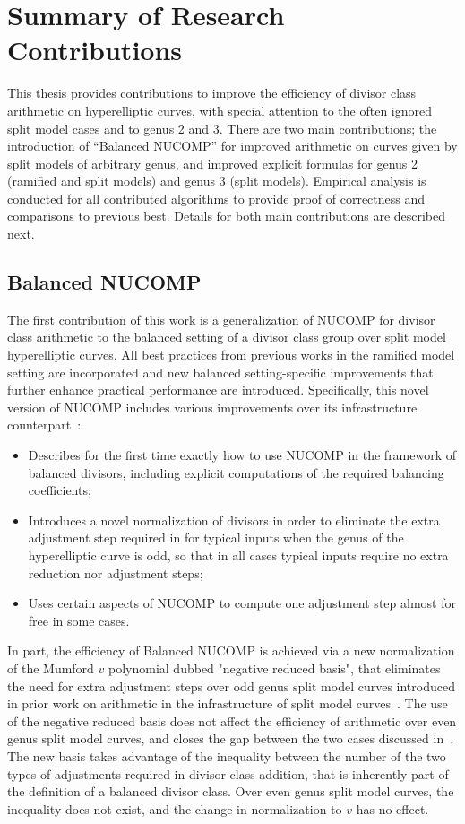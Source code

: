 \section{Summary of Research Contributions}
This thesis provides contributions to improve the efficiency of divisor class
arithmetic on hyperelliptic curves, with special attention to the often ignored
split model cases and to genus 2 and 3. There are two main contributions; the
introduction of ``Balanced NUCOMP'' for improved arithmetic on curves given by
split models of arbitrary genus, and improved explicit formulas for genus 2
(ramified and split models) and genus 3 (split models). Empirical analysis is
conducted for all contributed algorithms to provide proof of correctness and
comparisons to previous best. Details for both main contributions are described
next.




\subsection{Balanced NUCOMP}
The first contribution of this work is a generalization of NUCOMP for divisor
class arithmetic to the  balanced setting of a divisor class group over split
model hyperelliptic curves. All best practices from previous works in the
ramified model setting are incorporated and new balanced setting-specific
improvements that further enhance practical performance are introduced.
Specifically, this novel version of NUCOMP includes various improvements over
its infrastructure counterpart~\cite{jacobson_fast_2007}:
\begin{itemize}
    \item Describes for the first time exactly how to use NUCOMP in the
    framework of balanced divisors, including explicit computations of the
    required balancing coefficients;
    \item Introduces a novel normalization of divisors in order to eliminate
    the extra adjustment step required in \cite{jacobson_fast_2007} for typical
    inputs when the genus of the hyperelliptic curve is odd, so that in all
    cases typical inputs require no extra reduction nor adjustment steps;
    \item Uses certain aspects of NUCOMP to compute one adjustment step
    almost for free in some cases.
\end{itemize}

In part, the efficiency of Balanced NUCOMP is achieved via a new normalization
of the Mumford $v$ polynomial dubbed "negative reduced basis", that eliminates
the need for extra adjustment steps over odd genus split model curves introduced
in prior work on arithmetic in the infrastructure of split model
curves~\cite{jacobson_fast_2007}. The use of the negative reduced basis does not
affect the efficiency of arithmetic over even genus split model curves, and
closes the gap between the two cases discussed in~\cite{jacobson_fast_2007}. The
new basis takes advantage of the  inequality between the number of the two types
of adjustments required in divisor class addition, that is inherently part of
the definition of a balanced divisor class. Over even genus split model curves,
the inequality does not exist, and the change in normalization to $v$ has no
effect.

